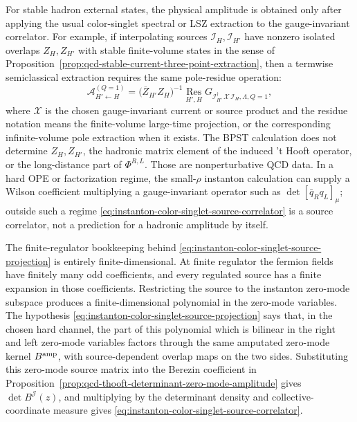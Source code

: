 \begin{controlledapproximation}
For stable hadron external states, the physical amplitude is obtained only
after applying the usual color-singlet spectral or LSZ extraction to the
gauge-invariant correlator.  For example, if interpolating sources
\(\mathcal I_H,\mathcal I_{H'}\) have nonzero isolated overlaps
\(Z_H,Z_{H'}\) with stable finite-volume states in the sense of
Proposition~\ref{prop:qcd-stable-current-three-point-extraction}, then a
termwise semiclassical extraction requires the same pole-residue operation:
\begin{equation}
  \mathcal A^{(Q=1)}_{H'\leftarrow H}
  =
  \bigl(\overline Z_{H'}Z_H\bigr)^{-1}
  \operatorname*{Res}_{H',H}
  G_{\mathcal I_{H'}^\dagger\,\mathcal X\,\mathcal I_H,\Lambda,Q=1},
  \label{eq:instanton-hadronic-residue-extraction}
\end{equation}
where \(\mathcal X\) is the chosen gauge-invariant current or source product
and the residue notation means the finite-volume large-time projection, or
the corresponding infinite-volume pole extraction when it exists.  The BPST
calculation does not determine \(Z_H,Z_{H'}\), the hadronic matrix element of
the induced 't Hooft operator, or the long-distance part of
\(\Phi^{R,L}\).  Those are nonperturbative QCD data.  In a hard OPE or
factorization regime, the small-\(\rho\) instanton calculation can supply a
Wilson coefficient multiplying a gauge-invariant operator such as
\(\det[\bar q_R q_L]_\mu\); outside such a regime
\eqref{eq:instanton-color-singlet-source-correlator} is a source correlator,
not a prediction for a hadronic amplitude by itself.
\end{controlledapproximation}

The finite-regulator bookkeeping behind
\eqref{eq:instanton-color-singlet-source-projection} is entirely
finite-dimensional.
At finite regulator the fermion fields have finitely many odd coefficients,
and every regulated source has a finite expansion in those coefficients.
Restricting the source to the instanton zero-mode subspace produces a
finite-dimensional polynomial in the zero-mode variables.  The hypothesis
\eqref{eq:instanton-color-singlet-source-projection} says that, in the
chosen hard channel, the part of this polynomial which is bilinear in the
right and left zero-mode variables factors through the same amputated
zero-mode kernel \(B^{\rm amp}\), with source-dependent overlap maps on the
two sides.  Substituting this zero-mode source matrix into the Berezin
coefficient in
Proposition~\ref{prop:qcd-thooft-determinant-zero-mode-amplitude} gives
\(\det B^{\mathcal J}(z)\), and multiplying by the determinant density and
collective-coordinate measure gives
\eqref{eq:instanton-color-singlet-source-correlator}.

